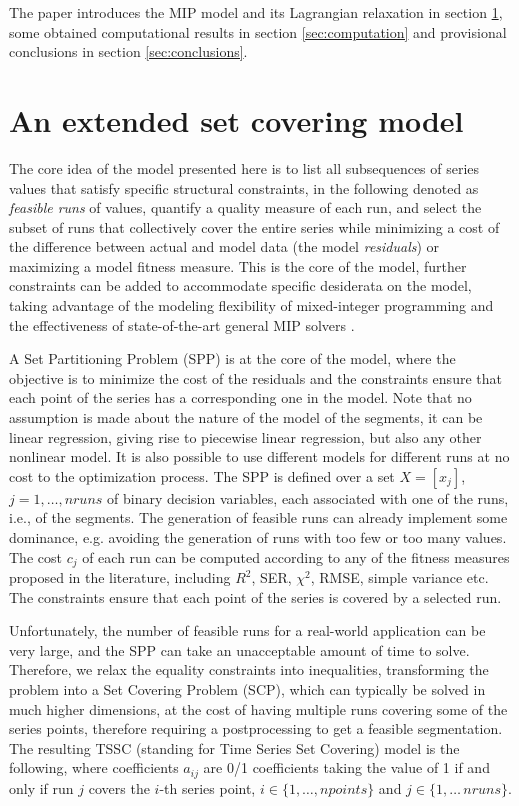 \documentclass[runningheads]{llncs}
\begin{document}
The paper introduces the MIP model and its Lagrangian relaxation in section \ref{sec:SCPmodel}, some obtained computational results in section \ref{sec:computation} and provisional conclusions in section \ref{sec:conclusions}.

\section{An extended set covering model} \label{sec:SCPmodel}

The core idea of the model presented here is to list all subsequences of series values that satisfy specific structural constraints, in the following denoted as {\it feasible runs} of  values, quantify a quality measure of each run, and select the subset of runs that collectively cover the entire series while minimizing a cost of the difference between actual and model data (the model {\it residuals}) or maximizing a model fitness measure. This is the core of the model, further constraints can be added to accommodate specific desiderata on the model, taking advantage of the modeling flexibility of mixed-integer programming and the effectiveness of state-of-the-art general MIP solvers \cite{FLS09}.

A Set Partitioning Problem (SPP) is at the core of the model, where the objective is to minimize the cost of the residuals and the constraints ensure that each point of the series has a corresponding one in the model. Note that no assumption is made about the nature of the model of the segments, it can be linear regression, giving rise to piecewise linear regression, but also any other nonlinear model. It is also possible to use different models for different runs at no cost to the optimization process. The SPP is defined over a set $X=[x_j]$, $j=1,\ldots,nruns$ of binary decision variables, each associated with one of the runs, i.e., of the segments. The generation of feasible runs can already implement some dominance, e.g. avoiding the generation of runs with too few or too many values. The cost $c_j$ of each run can be computed according to any of the fitness measures proposed in the literature, including $R^2$, SER, $\chi^2$, RMSE, simple variance etc. The constraints ensure that each point of the series is covered by a selected run. 

Unfortunately, the number of feasible runs for a real-world application can be very large, and the SPP can take an unacceptable amount of time to solve. Therefore, we relax the equality constraints into inequalities, transforming the problem into a Set Covering Problem (SCP), which can typically be solved in much higher dimensions, at the cost of having multiple runs covering some of the series points, therefore requiring a postprocessing to get a feasible segmentation. The resulting TSSC (standing for Time Series Set Covering) model is the following, where coefficients $a_{ij}$ are 0/1 coefficients taking the value of 1 if and only if run $j$ covers the $i$-th series point, $i \in \{1,\ldots,npoints\}$ and $j \in \{1,\ldots\,nruns\}$.
\end{document}
